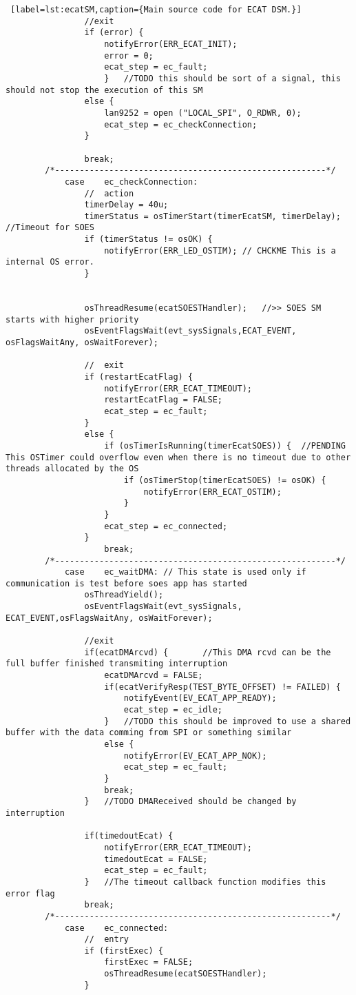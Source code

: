 \begin{lstlisting} [label=lst:ecatSM,caption={Main source code for ECAT DSM.}]
				//exit
				if (error) {
					notifyError(ERR_ECAT_INIT);
					error = 0;
					ecat_step = ec_fault;
					} 	//TODO this should be sort of a signal, this should not stop the execution of this SM
				else {
					lan9252 = open ("LOCAL_SPI", O_RDWR, 0);
					ecat_step = ec_checkConnection;
				}

				break;
		/*-------------------------------------------------------*/
			case	ec_checkConnection:
				//	action
				timerDelay = 40u;
				timerStatus = osTimerStart(timerEcatSM, timerDelay);	//Timeout for SOES
				if (timerStatus != osOK) {
					notifyError(ERR_LED_OSTIM); // CHCKME This is a internal OS error.
				}


				osThreadResume(ecatSOESTHandler);	//>> SOES SM starts with higher priority
				osEventFlagsWait(evt_sysSignals,ECAT_EVENT, osFlagsWaitAny, osWaitForever);

				//	exit
				if (restartEcatFlag) {
					notifyError(ERR_ECAT_TIMEOUT);
					restartEcatFlag = FALSE;
					ecat_step = ec_fault;
				}
				else {
					if (osTimerIsRunning(timerEcatSOES)) {	//PENDING This OSTimer could overflow even when there is no timeout due to other threads allocated by the OS
						if (osTimerStop(timerEcatSOES) != osOK) {
							notifyError(ERR_ECAT_OSTIM);
						}
					}
					ecat_step = ec_connected;
				}
					break;
		/*---------------------------------------------------------*/
			case	ec_waitDMA:	// This state is used only if communication is test before soes app has started
				osThreadYield();
				osEventFlagsWait(evt_sysSignals, ECAT_EVENT,osFlagsWaitAny, osWaitForever);

				//exit
				if(ecatDMArcvd) {		//This DMA rcvd can be the full buffer finished transmiting interruption
					ecatDMArcvd = FALSE;
					if(ecatVerifyResp(TEST_BYTE_OFFSET) != FAILED) {
						notifyEvent(EV_ECAT_APP_READY);
						ecat_step = ec_idle;
					}	//TODO this should be improved to use a shared buffer with the data comming from SPI or something similar
					else {
						notifyError(EV_ECAT_APP_NOK);
						ecat_step = ec_fault;
					}
					break;
				} 	//TODO DMAReceived should be changed by interruption

				if(timedoutEcat) {
					notifyError(ERR_ECAT_TIMEOUT);
					timedoutEcat = FALSE;
					ecat_step = ec_fault;
				} 	//The timeout callback function modifies this error flag
				break;
		/*--------------------------------------------------------*/
			case	ec_connected:
				//	entry
				if (firstExec) {
					firstExec = FALSE;
					osThreadResume(ecatSOESTHandler);
				}


\end{lstlisting}
